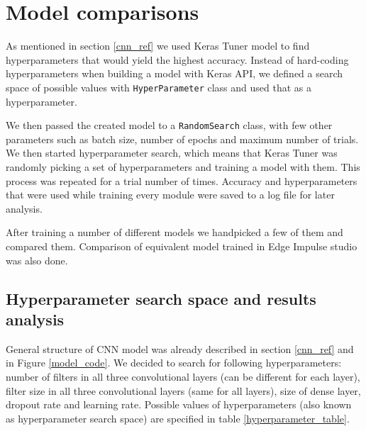 \section{ Model comparisons}\label{model_comparisons}

As mentioned in section \ref{cnn_ref} we used Keras Tuner model to find hyperparameters that would yield the highest accuracy.
Instead of hard-coding hyperparameters when building a model with Keras API, we defined a search space of possible values with \verb|HyperParameter| class and used that as a hyperparameter.

We then passed the created model to a \verb|RandomSearch| class, with few other parameters such as batch size, number of epochs and maximum number of trials.
We then started hyperparameter search, which means that Keras Tuner was randomly picking a set of hyperparameters and training a model with them. 
This process was repeated for a trial number of times.
Accuracy and hyperparameters that were used while training every module were saved to a log file for later analysis.

After training a number of different models we handpicked a few of them and compared them.
Comparison of equivalent model trained in Edge Impulse studio was also done.


\subsection{ Hyperparameter search space and results analysis}

General structure of CNN model was already described in section \ref{cnn_ref} and in Figure \ref{model_code}.
We decided to search for following hyperparameters: number of filters in all three convolutional layers (can be different for each layer), filter size in all three convolutional layers (same for all layers), size of dense layer, dropout rate and learning rate.
Possible values of hyperparameters (also known as hyperparameter search space) are specified in table \ref{hyperparameter_table}.

